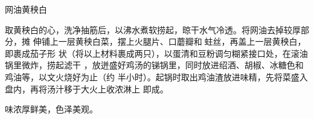 \begin{recipe}{网油黄秧白}

\ingredients


\preparation

取黄秧白的心，洗净抽筋后，以沸水煮软捞起，晾干水气冷透。将网油去掉较厚部分，摊
伸铺上一层黄秧白菜，摆上火腿片、口蘑瓣和𧎼蛀丝，再盖上一层黄秧白，即裹成茄子形
状（将以上材料裹成两只），以蛋清和豆粉调匀糊紧接口处，在滚油锅里微炸，捞起滤干
，放迸盛好鸡汤的锑锅里，同时放进绍酒、胡椒、冰糖色和鸡油等，以文火烧好为止（约
半小时）。起锅时取出鸡油渣放进味精，先将菜盛入盘内，再将汤汁移于大火上收浓淋上
即成。

\features

味浓厚鲜美，色泽美观。

\end{recipe}


